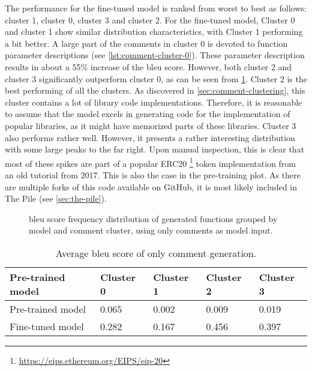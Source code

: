 The performance for the fine-tuned model is ranked from worst to best as follows: cluster 1, cluster 0, cluster 3 and cluster 2. For the fine-tuned model, Cluster 0 and cluster 1 show similar distribution characteristics, with Cluster 1 performing a bit better. A large part of the comments in cluster 0 is devoted to function parameter descriptions (see \cref{lst:comment-cluster-0}). These parameter description results in about a 55\% increase of the \acrshort{bleu} score. However, both cluster 2 and cluster 3 significantly outperform cluster 0, as can be seen from \cref{tab:comments-bleu-score}. Cluster 2 is the best performing of all the clusters. As discovered in \cref{sec:comment-clustering}, this cluster contains a lot of library code implementations. Therefore, it is reasonable to assume that the model excels in generating code for the implementation of popular libraries, as it might have memorized parts of these libraries. Cluster 3 also performs rather well. However, it presents a rather interesting distribution with some large peaks to the far right. Upon manual inspection, this is clear that most of these spikes are part of a popular ERC20 \footnote{\url{https://eips.ethereum.org/EIPS/eip-20}} token implementation from an old tutorial \cite{moritz2017how} from 2017. This is also the case in the pre-training plot. As there are multiple forks of this code available on GitHub, it is most likely included in The Pile (see \cref{sec:the-pile}).

\begin{figure}[htp]
    \centering
    
    \caption{\acrshort{bleu} score frequency distribution of generated functions grouped by model and comment cluster, using only comments as model input.}
    \label{fig:performance-comments}
\end{figure}

\begin{table}
    \def\arraystretch{1.5}
    \small
    \centering
    \caption{Average \acrshort{bleu} score of only comment generation.}
    \label{tab:comments-bleu-score}
    \begin{tabularx}{\textwidth}{XXXXX}
        \toprule
        \textbf{Pre-trained model} & Cluster 0 & Cluster 1 & Cluster 2 & Cluster 3\\
        \midrule
        Pre-trained model & 0.065 & 0.002 & 0.009 & 0.019\\
        Fine-tuned model & 0.282 & 0.167 & 0.456 & 0.397\\
        \bottomrule
    \end{tabularx}
\end{table}


